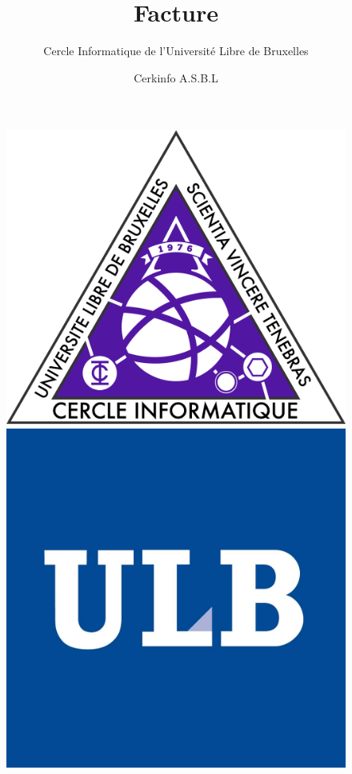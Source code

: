 \documentclass{article}
\title{Facture}
\author{Cercle Informatique de l'Université Libre de Bruxelles}
\date{Cerkinfo A.S.B.L}
\begin{document}
\thispagestyle{empty}
\begin{figure}
	\includegraphics[scale=0.025]{ci.png}
	\hfill
	\includegraphics[scale=0.35]{ulb.png}
  \label{fig:ci}
\end{figure}
\vspace{-5cm}
\maketitle
\end{document}
